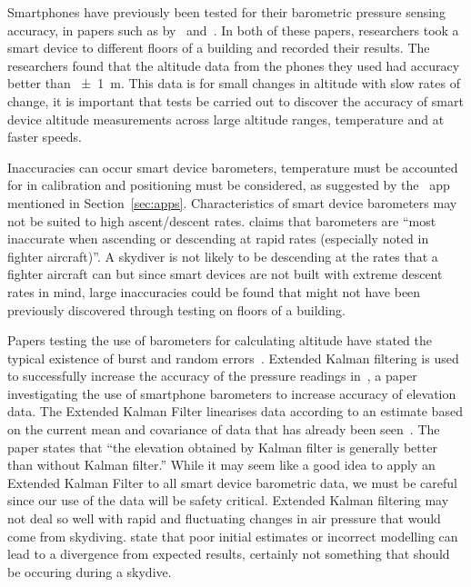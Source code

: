 \documentclass[11pt, twocolumn]{article}
\begin{document}
Smartphones have previously been tested for their barometric pressure sensing accuracy, in papers such as by~\textcite{keller_calibration_2012} and~\textcite{he_atmospheric_2012}. In both of these papers, researchers took a smart device to different floors of a building and recorded their results. The researchers found that the altitude data from the phones they used had accuracy better than \SI{\pm1}{\metre}. This data is for small changes in altitude with slow rates of change, it is important that tests be carried out to discover the accuracy of smart device altitude measurements across large altitude ranges, temperature and at faster speeds.

Inaccuracies can occur smart device barometers, temperature must be accounted for in calibration and positioning must be considered, as suggested by the~ app mentioned in Section~\ref{sec:apps}. Characteristics of smart device barometers may not be suited to high ascent/descent rates. \textcite{gray_integrated_1995} claims that barometers are ``most inaccurate when ascending or descending at rapid rates (especially noted in fighter aircraft)''. A skydiver is not likely to be descending at the rates that a fighter aircraft can but since smart devices are not built with extreme descent rates in mind, large inaccuracies could be found that might not have been previously discovered through testing on floors of a building.

Papers testing the use of barometers for calculating altitude have stated the typical existence of burst and random errors~\cite{gray_integrated_1995, liu_beyond_2014}. Extended Kalman filtering is used to successfully increase the accuracy of the pressure readings in~\textcite{liu_beyond_2014}, a paper investigating the use of smartphone barometers to increase accuracy of elevation data. The Extended Kalman Filter linearises data according to an estimate based on the current mean and covariance of data that has already been seen~\cite{julier_unscented_2004}. The paper states that ``the elevation obtained by Kalman filter is generally better than without Kalman filter.'' While it may seem like a good idea to apply an Extended Kalman Filter to all smart device barometric data, we must be careful since our use of the data will be safety critical. Extended Kalman filtering may not deal so well with rapid and fluctuating changes in air pressure that would come from skydiving. \textcite{huang_analysis_2008} state that poor initial estimates or incorrect modelling can lead to a divergence from expected results, certainly not something that should be occuring during a skydive.
\end{document}
